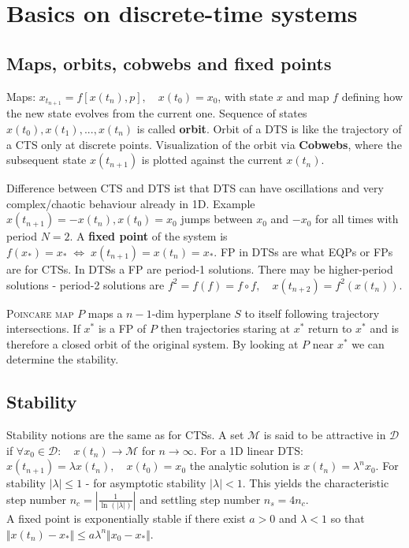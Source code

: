 \section{Basics on discrete-time systems}
\subsection{Maps, orbits, cobwebs and fixed points}
Maps: $x_{t_{n+1}}=f[x(t_n),p], \quad x(t_0)=x_0$, with state $x$ and map $f$ defining how the new state evolves from the current one. Sequence of states $x(t_0), x(t_1), ..., x(t_n)$ is called \textbf{orbit}. Orbit of a DTS is like the trajectory of a CTS only at discrete points. Visualization of the orbit via \textbf{Cobwebs}, where the subsequent state $x(t_{n+1})$ is plotted against the current $x(t_n)$.\vspace{0.1cm}

Difference between CTS and DTS ist that DTS can have oscillations and very complex/chaotic behaviour already in 1D. Example $x(t_{n+1})=-x(t_n), x(t_0)=x_0$ jumps between $x_0$ and $-x_0$ for all times with period $N=2$. A \textbf{fixed point} of the system is $f(x_*)=x_* \; \Leftrightarrow \; x(t_{n+1}) = x(t_n) = x_*$. FP in DTSs are what EQPs or FPs are for CTSs. In DTSs a FP are period-1 solutions. There may be higher-period solutions - period-2 solutions are $f^2 = f(f) = f \circ f, \quad x(t_{n+2})=f^2(x(t_n))$.\vspace{0.1cm}

\textsc{Poincare map} $P$ maps a $n-1$-dim hyperplane $S$ to itself following trajectory intersections. If $x^*$ is a FP of $P$ then trajectories staring at $x^*$ return to $x^*$ and is therefore a closed orbit of the original system. By looking at $P$ near $x^*$ we can determine the stability.

\subsection{Stability}
Stability notions are the same as for CTSs.
A set $\mathcal{M}$ is said to be attractive in $\mathcal{D}$ if $\forall x_0 \in \mathcal{D}: \quad x(t_n) \rightarrow \mathcal{M}$ for $n\rightarrow \infty$. For a 1D linear DTS: $x(t_{n+1})=\lambda x(t_n), \quad x(t_0)=x_0$ the analytic solution is $x(t_n)=\lambda^n x_0$. For stability $|\lambda|\leq 1$ - for asymptotic stability $|\lambda|<1$. This yields the characteristic step number $n_c=\left|\frac{1}{\ln(|\lambda|)}\right|$ and settling step number $n_s=4n_c$.\\
A fixed point is exponentially stable if there exist $a>0$ and $\lambda<1$ so that $\Vert x(t_n)-x_*\Vert \leq a\lambda^n\Vert x_0 - x_* \Vert$.\\

